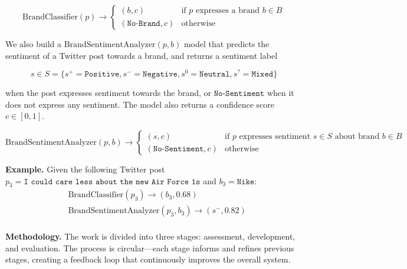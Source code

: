 \documentclass{article}
\begin{document}
\[
    \mathrm{BrandClassifier}(p) \rightarrow \begin{cases}
        (b, c)                 & \text{if } p \text{ expresses a brand } b \in
        B
        \\
        (\texttt{No-Brand}, c) & \text{otherwise}
    \end{cases}
\]

We also build a $\mathrm{BrandSentimentAnalyzer}(p, b)$ model that predicts the sentiment of a Twitter post towards a brand, and returns a sentiment label

\[
    s \in S =
    \{
    s^{+}=\texttt{Positive},
    s^{-}=\texttt{Negative},
    s^{0}=\texttt{Neutral},
    s^{?}=\texttt{Mixed}
    \}
\]

when the post expresses sentiment towards the brand, or $\texttt{No-Sentiment}$ when it does not express any sentiment. The model also returns a confidence score $c \in [0, 1]$.

\[
    \mathrm{BrandSentimentAnalyzer}(p, b) \rightarrow \begin{cases}
        (s, c)                     & \text{if } p \text{ expresses sentiment }
        s \in S \text{ about brand } b \in B
        \\
        (\texttt{No-Sentiment}, c) & \text{otherwise}
    \end{cases}
\]

\newpage

\textbf{Example.} Given the following Twitter post $p_3 = \texttt{I could care less about the new Air Force 1s}$ and $b_3 = \texttt{Nike}$:
\begin{align*}
     & \mathrm{BrandClassifier}(p_3) \rightarrow (b_3, 0.68)               \\
     & \mathrm{BrandSentimentAnalyzer}(p_3, b_3) \rightarrow (s^{-}, 0.82)
\end{align*}
\\
\textbf{Methodology.} The work is divided into three stages: assessment, development, and evaluation. The process is circular---each stage informs and refines previous stages, creating a feedback loop that continuously improves the overall system.\\
\end{document}
